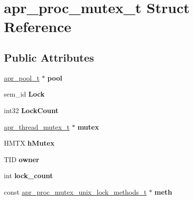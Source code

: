 \hypertarget{structapr__proc__mutex__t}{}\section{apr\+\_\+proc\+\_\+mutex\+\_\+t Struct Reference}
\label{structapr__proc__mutex__t}
\subsection*{Public Attributes}
\begin{DoxyCompactItemize}
\item 
\mbox{\label{structapr__proc__mutex__t_a2089fc7074e7a09ed1394083230f9707}} 
\mbox{\hyperlink{group__apr__pools_gaf137f28edcf9a086cd6bc36c20d7cdfb}{apr\+\_\+pool\+\_\+t}} $\ast$ {\bfseries pool}
\item 
\mbox{\label{structapr__proc__mutex__t_af2dcbd4497e99a186ed779de6bc5193f}} 
sem\+\_\+id {\bfseries Lock}
\item 
\mbox{\label{structapr__proc__mutex__t_ae1007187223409161fd5a522bafa011f}} 
int32 {\bfseries Lock\+Count}
\item 
\mbox{\label{structapr__proc__mutex__t_a4fb2becb93866ed96a60717a9face2c2}} 
\mbox{\hyperlink{structapr__thread__mutex__t}{apr\+\_\+thread\+\_\+mutex\+\_\+t}} $\ast$ {\bfseries mutex}
\item 
\mbox{\label{structapr__proc__mutex__t_a78ec67f1708f9f520573ca1032735584}} 
H\+M\+TX {\bfseries h\+Mutex}
\item 
\mbox{\label{structapr__proc__mutex__t_adf31e53256e072cfb5e16e7807132fcf}} 
T\+ID {\bfseries owner}
\item 
\mbox{\label{structapr__proc__mutex__t_a3bfbfcbb849cb18d6406181219ca6e89}} 
int {\bfseries lock\+\_\+count}
\item 
\mbox{\label{structapr__proc__mutex__t_a9ed4a16601501e9c5b4b3fd03c21f332}} 
const \mbox{\hyperlink{structapr__proc__mutex__unix__lock__methods__t}{apr\+\_\+proc\+\_\+mutex\+\_\+unix\+\_\+lock\+\_\+methods\+\_\+t}} $\ast$ {\bfseries meth}

\end{DoxyCompactItemize}
